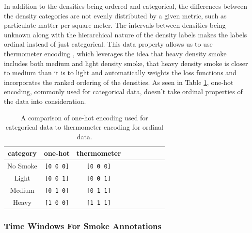 \documentclass{article}
\begin{document}
In addition to the densities being ordered and categorical, the differences between the density categories are not evenly distributed by a given metric, such as particulate matter per square meter. The intervals between densities being unknown along with the hierarchical nature of the density labels makes the labels ordinal instead of just categorical. This data property allows us to use thermometer encoding \cite{therm_enc}, which leverages the idea that heavy density smoke includes both medium and light density smoke, that heavy density smoke is closer to medium than it is to light and automatically weights the loss functions and incorporates the ranked ordering of the densities.  As seen in Table \ref{therm}, one-hot encoding, commonly used for categorical data, doesn't take ordinal properties of the data into consideration.  

\begin{table}[h] 
    \caption{A comparison of one-hot encoding used for categorical data to thermometer encoding for ordinal data.}\label{therm}
    \centering
    \begin{tabular}{ccccrrcrc}
        \toprule
        category & one-hot & thermometer \\
        \midrule
        No Smoke & \texttt{[0 0 0]} & \texttt{[0 0 0]} \\
        Light  & \texttt{[0 0 1]} & \texttt{[0 0 1]} \\
        Medium & \texttt{[0 1 0]} & \texttt{[0 1 1]} \\
        Heavy  & \texttt{[1 0 0]} & \texttt{[1 1 1]} \\
        \bottomrule
    \end{tabular}
\end{table}

\subsubsection*{Time Windows For Smoke Annotations}
\end{document}
